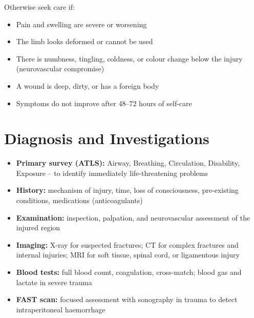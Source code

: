 Otherwise seek care if:
\begin{itemize}
    \item Pain and swelling are severe or worsening
    \item The limb looks deformed or cannot be used
    \item There is numbness, tingling, coldness, or colour change below the injury (neurovascular compromise)
    \item A wound is deep, dirty, or has a foreign body
    \item Symptoms do not improve after 48--72 hours of self-care
\end{itemize}

\section*{Diagnosis and Investigations}
\begin{itemize}
    \item \textbf{Primary survey (ATLS):} Airway, Breathing, Circulation, Disability, Exposure -- to identify immediately life-threatening problems
    \item \textbf{History:} mechanism of injury, time, loss of consciousness, pre-existing conditions, medications (anticoagulants)
    \item \textbf{Examination:} inspection, palpation, and neurovascular assessment of the injured region
    \item \textbf{Imaging:} X-ray for suspected fractures; CT for complex fractures and internal injuries; MRI for soft tissue, spinal cord, or ligamentous injury
    \item \textbf{Blood tests:} full blood count, coagulation, cross-match; blood gas and lactate in severe trauma
    \item \textbf{FAST scan:} focused assessment with sonography in trauma to detect intraperitoneal haemorrhage
\end{itemize}

